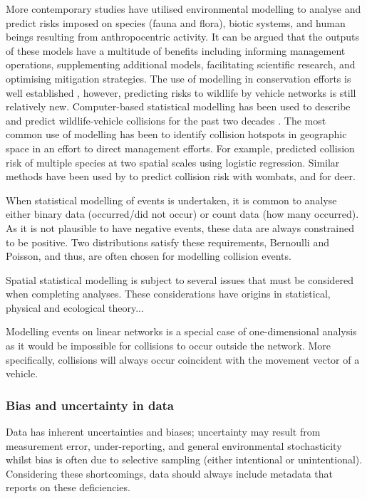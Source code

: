 More contemporary studies have utilised environmental modelling to analyse and predict risks imposed on species (fauna and flora), biotic systems, and human beings resulting from anthropocentric activity. It can be argued that the outputs of these models have a multitude of benefits including informing management operations, supplementing additional models, facilitating scientific research, and optimising mitigation strategies.  The use of modelling in conservation efforts is well established \citep{star86}, however, predicting risks to wildlife by vehicle networks is still relatively new. Computer-based statistical modelling has been used to describe and predict wildlife-vehicle collisions for the past two decades \citep{guns11}.  The most common use of modelling has been to identify collision hotspots in geographic space in an effort to direct management efforts.  For example, \cite{malo04} predicted collision risk of multiple species at two spatial scales using logistic regression.  Similar methods have been used by \cite{roge09} to predict collision risk with wombats, and \cite{sudh09} for deer.

When statistical modelling of events is undertaken, it is common to analyse either binary data (occurred/did not occur) or count data (how many occurred).  As it is not plausible to have negative events, these data are always constrained to be positive. Two distributions satisfy these requirements, Bernoulli and Poisson, and thus, are often chosen for modelling collision events. 

Spatial statistical modelling is subject to several issues that must be considered when completing analyses.  These considerations have origins in statistical, physical and ecological theory...

Modelling events on linear networks is a special case of one-dimensional analysis as it would be impossible for collisions to occur outside the network.  More specifically, collisions will always occur coincident with the movement vector of a vehicle.

\subsubsection{Bias and uncertainty in data}

Data has inherent uncertainties and biases; uncertainty may result from measurement error, under-reporting, and general environmental stochasticity whilst bias is often due to selective sampling (either intentional or unintentional). Considering these shortcomings, data should always include metadata that reports on these deficiencies.

